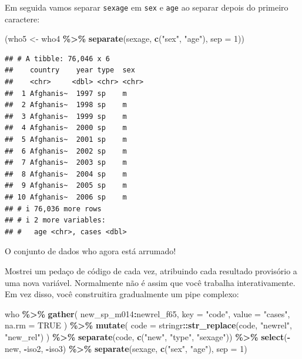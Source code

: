 \documentclass[
]{latex/krantz}
\newenvironment{Shaded}{\begin{snugshade}}{\end{snugshade}}
\newcommand{\AttributeTok}[1]{\textcolor[rgb]{0.13,0.29,0.53}{#1}}
\newcommand{\ConstantTok}[1]{\textcolor[rgb]{0.56,0.35,0.01}{#1}}
\newcommand{\DecValTok}[1]{\textcolor[rgb]{0.00,0.00,0.81}{#1}}
\newcommand{\FunctionTok}[1]{\textcolor[rgb]{0.13,0.29,0.53}{\textbf{#1}}}
\newcommand{\NormalTok}[1]{#1}
\newcommand{\OtherTok}[1]{\textcolor[rgb]{0.56,0.35,0.01}{#1}}
\newcommand{\SpecialCharTok}[1]{\textcolor[rgb]{0.81,0.36,0.00}{\textbf{#1}}}
\newcommand{\StringTok}[1]{\textcolor[rgb]{0.31,0.60,0.02}{#1}}
\theoremstyle{definition}
\theoremstyle{definition}
\theoremstyle{definition}
\theoremstyle{definition}
\theoremstyle{remark}
\begin{document}
Em seguida vamos separar \texttt{sexage} em \texttt{sex} e \texttt{age} ao separar depois do primeiro caractere:

\begin{Shaded}
\begin{Highlighting}[]
\NormalTok{(who5 }\OtherTok{\textless{}{-}}\NormalTok{ who4 }\SpecialCharTok{\%\textgreater{}\%}
   \FunctionTok{separate}\NormalTok{(sexage, }\FunctionTok{c}\NormalTok{(}\StringTok{"sex"}\NormalTok{, }\StringTok{"age"}\NormalTok{), }\AttributeTok{sep =} \DecValTok{1}\NormalTok{))}
\end{Highlighting}
\end{Shaded}

\begin{verbatim}
## # A tibble: 76,046 x 6
##    country    year type  sex  
##    <chr>     <dbl> <chr> <chr>
##  1 Afghanis~  1997 sp    m    
##  2 Afghanis~  1998 sp    m    
##  3 Afghanis~  1999 sp    m    
##  4 Afghanis~  2000 sp    m    
##  5 Afghanis~  2001 sp    m    
##  6 Afghanis~  2002 sp    m    
##  7 Afghanis~  2003 sp    m    
##  8 Afghanis~  2004 sp    m    
##  9 Afghanis~  2005 sp    m    
## 10 Afghanis~  2006 sp    m    
## # i 76,036 more rows
## # i 2 more variables:
## #   age <chr>, cases <dbl>
\end{verbatim}

O conjunto de dados who agora está arrumado!

Mostrei um pedaço de código de cada vez, atribuindo cada resultado provisório a uma nova variável. Normalmente não é assim que você trabalha interativamente. Em vez disso, você construitira gradualmente um pipe complexo:

\begin{Shaded}
\begin{Highlighting}[]
\NormalTok{who }\SpecialCharTok{\%\textgreater{}\%}
  \FunctionTok{gather}\NormalTok{(}
\NormalTok{    new\_sp\_m014}\SpecialCharTok{:}\NormalTok{newrel\_f65, }
    \AttributeTok{key =} \StringTok{"code"}\NormalTok{,}
    \AttributeTok{value =} \StringTok{"cases"}\NormalTok{,}
    \AttributeTok{na.rm =} \ConstantTok{TRUE}
\NormalTok{  ) }\SpecialCharTok{\%\textgreater{}\%}
  \FunctionTok{mutate}\NormalTok{(}
    \AttributeTok{code =}\NormalTok{ stringr}\SpecialCharTok{::}\FunctionTok{str\_replace}\NormalTok{(code, }\StringTok{"newrel"}\NormalTok{, }\StringTok{"new\_rel"}\NormalTok{)}
\NormalTok{  ) }\SpecialCharTok{\%\textgreater{}\%}
  \FunctionTok{separate}\NormalTok{(code, }\FunctionTok{c}\NormalTok{(}\StringTok{"new"}\NormalTok{, }\StringTok{"type"}\NormalTok{, }\StringTok{"sexage"}\NormalTok{)) }\SpecialCharTok{\%\textgreater{}\%}
  \FunctionTok{select}\NormalTok{(}\SpecialCharTok{{-}}\NormalTok{new, }\SpecialCharTok{{-}}\NormalTok{iso2, }\SpecialCharTok{{-}}\NormalTok{iso3) }\SpecialCharTok{\%\textgreater{}\%}
  \FunctionTok{separate}\NormalTok{(sexage, }\FunctionTok{c}\NormalTok{(}\StringTok{"sex"}\NormalTok{, }\StringTok{"age"}\NormalTok{), }\AttributeTok{sep =} \DecValTok{1}\NormalTok{)}
\end{Highlighting}
\end{Shaded}
\end{document}
